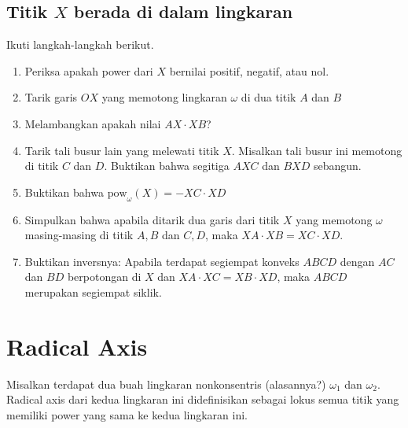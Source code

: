 \documentclass[11pt]{scrartcl}
\begin{document}
\subsection{Titik $X$ berada di dalam lingkaran}
Ikuti langkah-langkah berikut.
\begin{enumerate}
    \item Periksa apakah power dari $X$ bernilai positif, negatif, atau nol.
    \item Tarik garis $OX$ yang memotong lingkaran $\omega$ di dua titik $A$ dan $B$
    \item Melambangkan apakah nilai $AX \cdot XB$?
    \item Tarik tali busur lain yang melewati titik $X$. Misalkan tali busur ini memotong di titik $C$ dan $D$. Buktikan bahwa segitiga $AXC$ dan $BXD$ sebangun.
    \item Buktikan bahwa $\text{pow}_{\omega}(X) = - XC\cdot XD$
    \item Simpulkan bahwa apabila ditarik dua garis dari titik $X$ yang memotong $\omega$ masing-masing di titik $A, B$ dan $C, D$, maka $XA\cdot XB = XC\cdot XD$.
    \item Buktikan inversnya: Apabila terdapat segiempat konveks $ABCD$ dengan $AC$ dan $BD$ berpotongan di $X$ dan $XA\cdot XC = XB\cdot XD$, maka $ABCD$ merupakan segiempat siklik. 
\end{enumerate}

\section{Radical Axis}
Misalkan terdapat dua buah lingkaran nonkonsentris (alasannya?) $\omega_1$ dan $\omega_2$. Radical axis dari kedua lingkaran ini didefinisikan sebagai lokus semua titik yang memiliki power yang sama ke kedua lingkaran ini.
\end{document}

